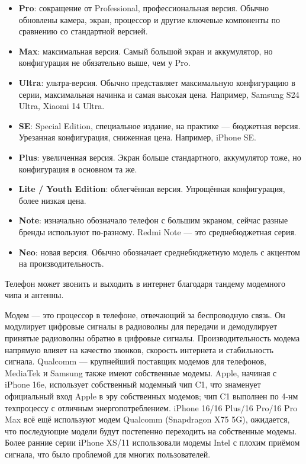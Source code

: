 
\begin{itemize}
  \item \textbf{Pro}: сокращение от Professional, профессиональная версия. Обычно обновлены камера, экран, процессор и другие ключевые компоненты по сравнению со стандартной версией.
  \item \textbf{Max}: максимальная версия. Самый большой экран и аккумулятор, но конфигурация не обязательно выше, чем у Pro.
  \item \textbf{Ultra}: ультра-версия. Обычно представляет максимальную конфигурацию в серии, максимальная начинка и самая высокая цена. Например, Samsung S24 Ultra, Xiaomi 14 Ultra.
  \item \textbf{SE}: Special Edition, специальное издание, на практике — бюджетная версия. Урезанная конфигурация, сниженная цена. Например, iPhone SE.
  \item \textbf{Plus}: увеличенная версия. Экран больше стандартного, аккумулятор тоже, но конфигурация в основном та же.
  \item \textbf{Lite / Youth Edition}: облегчённая версия. Упрощённая конфигурация, более низкая цена.
  \item \textbf{Note}: изначально обозначало телефон с большим экраном, сейчас разные бренды используют по-разному. Redmi Note — это среднебюджетная серия.
  \item \textbf{Neo}: новая версия. Обычно обозначает среднебюджетную модель с акцентом на производительность.
\end{itemize}


Телефон может звонить и выходить в интернет благодаря тандему модемного чипа и антенны.


Модем — это процессор в телефоне, отвечающий за беспроводную связь. Он модулирует цифровые сигналы в радиоволны для передачи и демодулирует принятые радиоволны обратно в цифровые сигналы. Производительность модема напрямую влияет на качество звонков, скорость интернета и стабильность сигнала. Qualcomm — крупнейший поставщик модемов для телефонов, MediaTek и Samsung также имеют собственные модемы. Apple, начиная с iPhone 16e, использует собственный модемный чип C1, что знаменует официальный вход Apple в эру собственных модемов; чип C1 выполнен по 4-нм техпроцессу с отличным энергопотреблением. iPhone 16/16 Plus/16 Pro/16 Pro Max всё ещё используют модем Qualcomm (Snapdragon X75 5G), ожидается, что последующие модели будут постепенно переходить на собственные модемы. Более ранние серии iPhone XS/11 использовали модемы Intel с плохим приёмом сигнала, что было проблемой для многих пользователей.

